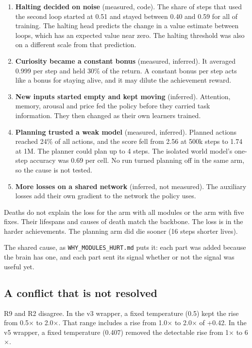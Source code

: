 \documentclass[11pt]{article}
\begin{document}
\begin{enumerate}
\item \textbf{Halting decided on noise} (measured, code). The share of steps that used the second loop started at 0.51 and stayed between 0.40 and 0.59 for all of training. The halting head predicts the change in a value estimate between loops, which has an expected value near zero. The halting threshold was also on a different scale from that prediction.
\item \textbf{Curiosity became a constant bonus} (measured, inferred). It averaged 0.999 per step and held 30\% of the return. A constant bonus per step acts like a bonus for staying alive, and it may dilute the achievement reward.
\item \textbf{New inputs started empty and kept moving} (inferred). Attention, memory, arousal and price fed the policy before they carried task information. They then changed as their own learners trained.
\item \textbf{Planning trusted a weak model} (measured, inferred). Planned actions reached 24\% of all actions, and the score fell from 2.56 at 500k steps to 1.74 at 1M. The planner could plan up to 4 steps. The isolated world model's one-step accuracy was 0.69 per cell. No run turned planning off in the same arm, so the cause is not tested.
\item \textbf{More losses on a shared network} (inferred, not measured). The auxiliary losses add their own gradient to the network the policy uses.
\end{enumerate}

Deaths do not explain the loss for the arm with all modules or the arm with five fixes. Their lifespans and causes of death match the backbone. The loss is in the harder achievements. The planning arm did die sooner (16 steps shorter lives).

The shared cause, as \texttt{WHY\_MODULES\_HURT.md} puts it: each part was added because the brain has one, and each part sent its signal whether or not the signal was useful yet.

\subsection{A conflict that is not resolved}

R9 and R2 disagree. In the v3 wrapper, a fixed temperature (0.5) kept the rise from 0.5$\times$ to 2.0$\times$. That range includes a rise from 1.0$\times$ to 2.0$\times$ of +0.42. In the v5 wrapper, a fixed temperature (0.407) removed the detectable rise from 1$\times$ to 6$\times$.
\end{document}
